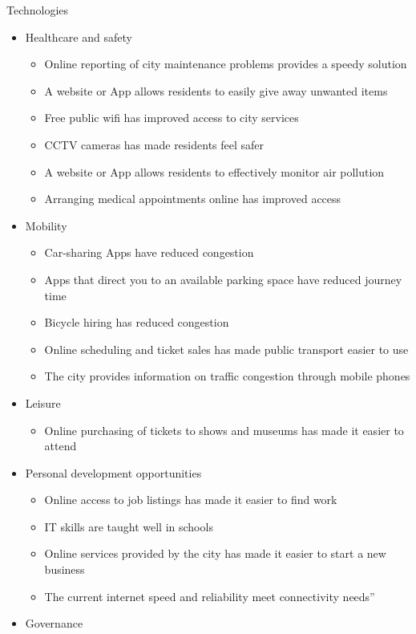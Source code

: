 \documentclass[
  english,
  12pt,
  a4paper,
]{scrartcl}
\providecommand{\tightlist}{%
  \setlength{\itemsep}{0pt}\setlength{\parskip}{0pt}}
\begin{document}
Technologies

\begin{itemize}
\tightlist
\item
  Healthcare and safety

  \begin{itemize}
  \tightlist
  \item
    Online reporting of city maintenance problems provides a speedy
    solution
  \item
    A website or App allows residents to easily give away unwanted items
  \item
    Free public wifi has improved access to city services
  \item
    CCTV cameras has made residents feel safer
  \item
    A website or App allows residents to effectively monitor air
    pollution
  \item
    Arranging medical appointments online has improved access
  \end{itemize}
\item
  Mobility

  \begin{itemize}
  \tightlist
  \item
    Car-sharing Apps have reduced congestion
  \item
    Apps that direct you to an available parking space have reduced
    journey time
  \item
    Bicycle hiring has reduced congestion
  \item
    Online scheduling and ticket sales has made public transport easier
    to use
  \item
    The city provides information on traffic congestion through mobile
    phones
  \end{itemize}
\item
  Leisure

  \begin{itemize}
  \tightlist
  \item
    Online purchasing of tickets to shows and museums has made it easier
    to attend
  \end{itemize}
\item
  Personal development opportunities

  \begin{itemize}
  \tightlist
  \item
    Online access to job listings has made it easier to find work
  \item
    IT skills are taught well in schools
  \item
    Online services provided by the city has made it easier to start a
    new business
  \item
    The current internet speed and reliability meet connectivity needs''
  \end{itemize}
\item
  Governance


\end{itemize}
\end{document}
